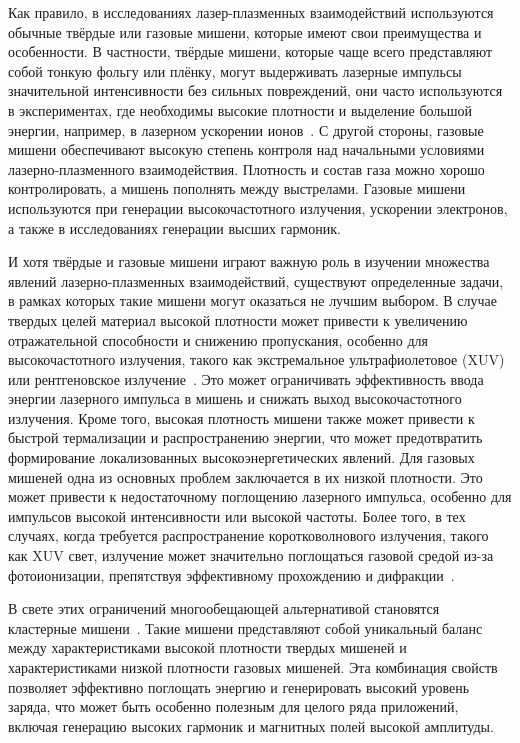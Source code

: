 Как правило, в исследованиях лазер-плазменных взаимодействий используются обычные твёрдые или газовые мишени, которые имеют свои преимущества и особенности. В частности, твёрдые мишени, которые чаще всего представляют собой тонкую фольгу или плёнку, могут выдерживать лазерные импульсы значительной интенсивности без сильных повреждений, они часто используются в экспериментах, где необходимы высокие плотности и выделение большой энергии, например, в лазерном ускорении ионов~\cite{chen1987introduction}. С другой стороны, газовые мишени обеспечивают высокую степень контроля над начальными условиями лазерно-плазменного взаимодействия. Плотность и состав газа можно хорошо контролировать, а мишень пополнять между выстрелами. Газовые мишени используются при генерации высокочастотного излучения, ускорении электронов, а также в исследованиях генерации высших гармоник.

И хотя твёрдые и газовые мишени играют важную роль в изучении множества явлений лазерно-плазменных взаимодействий, существуют определенные задачи, в рамках которых такие мишени могут оказаться не лучшим выбором. В случае твердых целей материал высокой плотности может привести к увеличению отражательной способности и снижению пропускания, особенно для высокочастотного излучения, такого как экстремальное ультрафиолетовое (XUV) или рентгеновское излучение~\cite{boren_huffman}. Это может ограничивать эффективность ввода энергии лазерного импульса в мишень и снижать выход высокочастотного излучения. Кроме того, высокая плотность мишени также может привести к быстрой термализации и распространению энергии, что может предотвратить формирование локализованных высокоэнергетических явлений. Для газовых мишеней одна из основных проблем заключается в их низкой плотности. Это может привести к недостаточному поглощению лазерного импульса, особенно для импульсов высокой интенсивности или высокой частоты. Более того, в тех случаях, когда требуется распространение коротковолнового излучения, такого как XUV свет, излучение может значительно поглощаться газовой средой из-за фотоионизации, препятствуя эффективному прохождению и дифракции~\cite{boren_huffman}.

В свете этих ограничений многообещающей альтернативой становятся кластерные мишени~\cite{Krainov2000}. Такие мишени представляют собой уникальный баланс между характеристиками высокой плотности твердых мишеней и характеристиками низкой плотности газовых мишеней. Эта комбинация свойств позволяет эффективно поглощать энергию и генерировать высокий уровень заряда, что может быть особенно полезным для целого ряда приложений, включая генерацию высоких гармоник и магнитных полей высокой амплитуды.

